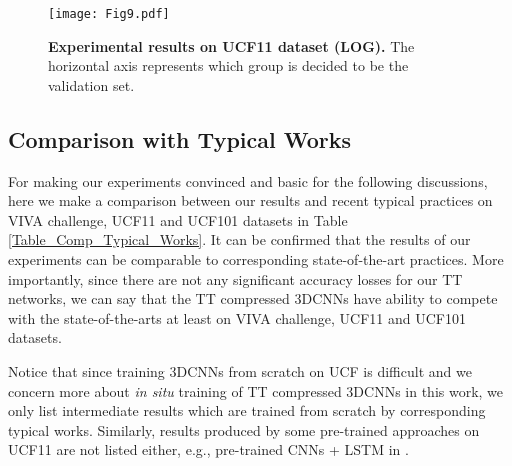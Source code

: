 \documentclass[a4paper,fleqn]{cas-dc}
\begin{document}
\begin{figure}
\centering
\texttt{[image: Fig9.pdf]}
\caption{\textbf{Experimental results on UCF11 dataset (LOG).} The horizontal axis represents which group is decided to be the validation set.}
\label{Fig_UCF11_LOG}
\end{figure}

\subsection{Comparison with Typical Works}

For making our experiments convinced and basic for the following discussions, here we make a comparison between our results and recent typical practices on VIVA challenge, UCF11 and UCF101 datasets in Table \ref{Table_Comp_Typical_Works}. It can be confirmed that the results of our experiments can be comparable to corresponding state-of-the-art practices. More importantly, since there are not any significant accuracy losses for our TT networks, we can say that the TT compressed 3DCNNs have ability to compete with the state-of-the-arts at least on VIVA challenge, UCF11 and UCF101 datasets.

Notice that since training 3DCNNs from scratch on UCF is difficult \citep{Hara_2018_Res3DCNN} and we concern more about \emph{in situ} training of TT compressed 3DCNNs in this work, we only list intermediate results which are trained from scratch by corresponding typical works. Similarly, results produced by some pre-trained approaches on UCF11 are not listed either, e.g., pre-trained CNNs + LSTM in \citet{Pan_2019_UCF11}.
\end{document}
